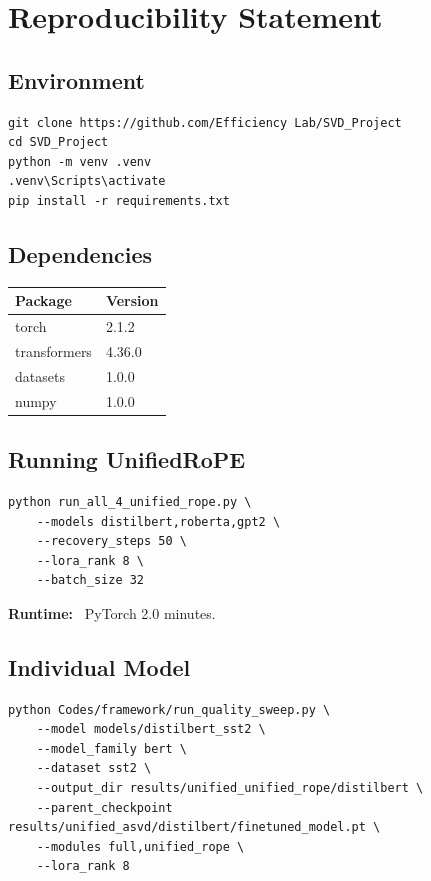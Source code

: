 
\section{Reproducibility Statement}

\subsection{Environment}

\begin{lstlisting}
git clone https://github.com/Efficiency Lab/SVD_Project
cd SVD_Project
python -m venv .venv
.venv\Scripts\activate
pip install -r requirements.txt
\end{lstlisting}

\subsection{Dependencies}

\begin{table}[H]
\centering
\small
\begin{tabular}{ll}
\toprule
\textbf{Package} & \textbf{Version} \\
\midrule
torch & 2.1.2 \\
transformers & 4.36.0 \\
datasets & 1.0.0 \\
numpy & 1.0.0 \\
\bottomrule
\end{tabular}
\end{table}

\subsection{Running UnifiedRoPE}

\begin{lstlisting}
python run_all_4_unified_rope.py \
    --models distilbert,roberta,gpt2 \
    --recovery_steps 50 \
    --lora_rank 8 \
    --batch_size 32
\end{lstlisting}

\textbf{Runtime:} ~PyTorch 2.0 minutes.

\subsection{Individual Model}

\begin{lstlisting}
python Codes/framework/run_quality_sweep.py \
    --model models/distilbert_sst2 \
    --model_family bert \
    --dataset sst2 \
    --output_dir results/unified_unified_rope/distilbert \
    --parent_checkpoint results/unified_asvd/distilbert/finetuned_model.pt \
    --modules full,unified_rope \
    --lora_rank 8
\end{lstlisting}

